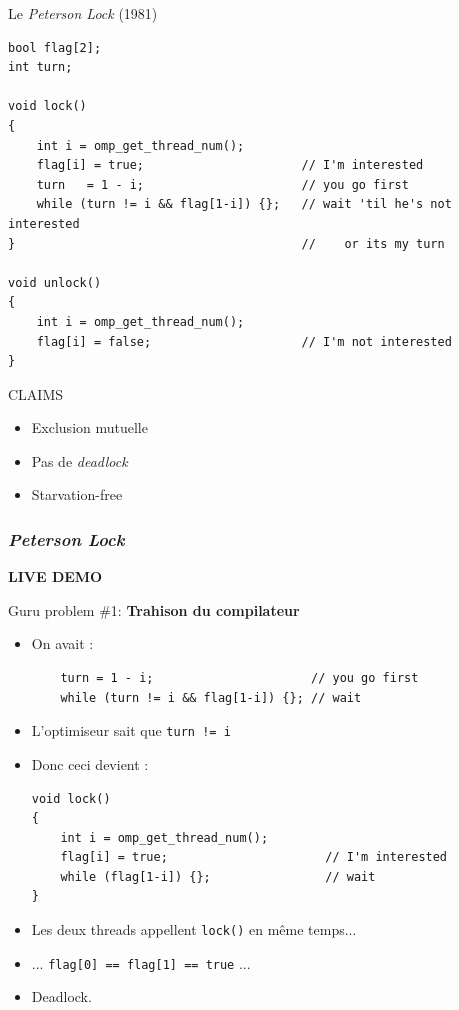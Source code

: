 \documentclass[xcolor={x11names,svgnames}]{beamer}
\begin{document}
\begin{frame}[fragile, label=peterson_code]
  \begin{block}{Le \emph{Peterson Lock} (1981)}
\begin{verbatim}
bool flag[2];
int turn;

void lock()
{
    int i = omp_get_thread_num();
    flag[i] = true;                      // I'm interested
    turn   = 1 - i;                      // you go first
    while (turn != i && flag[1-i]) {};   // wait 'til he's not interested
}                                        //    or its my turn

void unlock() 
{
    int i = omp_get_thread_num();
    flag[i] = false;                     // I'm not interested
}
\end{verbatim}
\end{block}

\begin{alertblock}{CLAIMS}
  \begin{itemize}
  \item Exclusion mutuelle
  \item Pas de \emph{deadlock}
  \item Starvation-free
  \end{itemize}
\end{alertblock}
\end{frame}


\begin{frame}[label=peterson_demo]
  \frametitle{\emph{Peterson Lock}}

  \centering \Huge \bfseries LIVE DEMO
\end{frame}


\begin{frame}[label=peterson_report1, fragile]

  \begin{block}{Guru problem \#1: \bfseries Trahison du compilateur}
    \begin{itemize}
      \item On avait :
    \begin{verbatim}
    turn = 1 - i;                      // you go first
    while (turn != i && flag[1-i]) {}; // wait
\end{verbatim}

\item L'optimiseur \og sait\fg{} que \texttt{turn != i}
\item Donc ceci devient :
  \begin{verbatim}
void lock()
{
    int i = omp_get_thread_num();
    flag[i] = true;                      // I'm interested
    while (flag[1-i]) {};                // wait
}
\end{verbatim}
\item Les deux threads appellent \texttt{lock()} en même temps...
\item ... \texttt{flag[0] == flag[1] == true} ...
\item Deadlock.
\end{itemize}
\end{block}
\end{frame}
\end{document}
